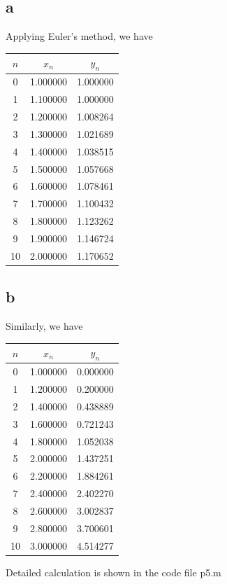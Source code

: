\documentclass[11pt,a4paper]{report}
\theoremstyle{remark}
\begin{document}
\subsection*{a}
Applying Euler's method, we have
\begin{table}[htbp]
  \centering
  \begin{tabular}{c|c|c}
    $n$ & $x_n$ & $y_n$ \\ \hline
    0 & 1.000000 & 1.000000 \\
    1 & 1.100000 & 1.000000 \\
    2 & 1.200000 & 1.008264 \\
    3 & 1.300000 & 1.021689 \\
    4 & 1.400000 & 1.038515 \\
    5 & 1.500000 & 1.057668 \\
    6 & 1.600000 & 1.078461 \\
    7 & 1.700000 & 1.100432 \\
    8 & 1.800000 & 1.123262 \\
    9 & 1.900000 & 1.146724 \\
    10 & 2.000000 & 1.170652 \\
  \end{tabular}
\end{table}
\subsection*{b}
Similarly, we have
\begin{center}
  \begin{tabular}{c|c|c}
    $n$ & $x_n$ & $y_n$ \\ \hline
    0 & 1.000000 & 0.000000 \\
    1 & 1.200000 & 0.200000 \\
    2 & 1.400000 & 0.438889 \\
    3 & 1.600000 & 0.721243 \\
    4 & 1.800000 & 1.052038 \\
    5 & 2.000000 & 1.437251 \\
    6 & 2.200000 & 1.884261 \\
    7 & 2.400000 & 2.402270 \\
    8 & 2.600000 & 3.002837 \\
    9 & 2.800000 & 3.700601 \\
    10 & 3.000000 & 4.514277 \\
  \end{tabular}
\end{center}

Detailed calculation is shown in the code file p5.m
\end{document}
